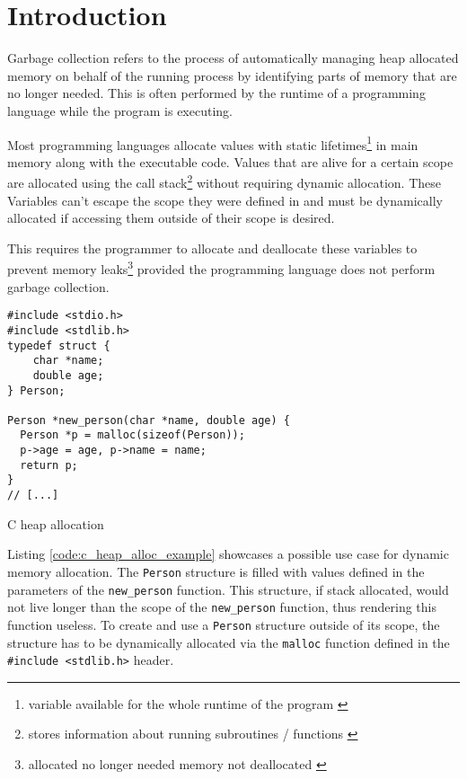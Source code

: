 \chapter{Introduction}
\label{sec:introduction}

Garbage collection refers to the process of automatically managing heap
allocated memory on behalf of the running process by identifying parts of
memory that are no longer needed. This is often performed by the runtime of a
programming language while the program is executing.
\cite[Introduction]{go_gcguide_2022} \cite[Introduction]{go_spec_2023} 

Most programming languages allocate values with static
lifetimes\footnote{variable available for the whole runtime of the program
\cite[Abstract]{static-dynamic-scope_tanter_2009}} in main memory along with
the executable code. Values that are alive for a certain scope are allocated
using the call stack\footnote{stores information about running subroutines /
functions \cite[2.2 Call Stacks]{call-stack_mcmaster-memon_2006}} without
requiring dynamic allocation. These Variables can't escape the scope they were
defined in and must be dynamically allocated if accessing them outside of
their scope is desired.

This requires the programmer to allocate and deallocate these
variables to prevent memory leaks\footnote{allocated no longer needed memory
not deallocated \cite[1.2.1 A Practical Object Ownership
Model]{practical_heine-lam_2003}} provided the programming language does not
perform garbage collection. 

\begin{listing}[H] 
    \begin{verbatim} 
#include <stdio.h>
#include <stdlib.h>
typedef struct { 
    char *name;
    double age; 
} Person;

Person *new_person(char *name, double age) {
  Person *p = malloc(sizeof(Person));
  p->age = age, p->name = name;
  return p;
}
// [...]
    \end{verbatim}
    \caption{C heap allocation}
    \label{code:c_heap_alloc_example}
\end{listing}

Listing \autoref{code:c_heap_alloc_example} showcases a possible use case for
dynamic memory allocation. The \texttt{Person} structure is filled with values
defined in the parameters of the \texttt{new\_person} function. This structure,
if stack allocated, would not live longer than the scope of the
\texttt{new\_person} function, thus rendering this function useless. To create
and use a \texttt{Person} structure outside of its scope, the structure has to
be dynamically allocated via the \texttt{malloc} function defined in the
\texttt{#include <stdlib.h>} header.

